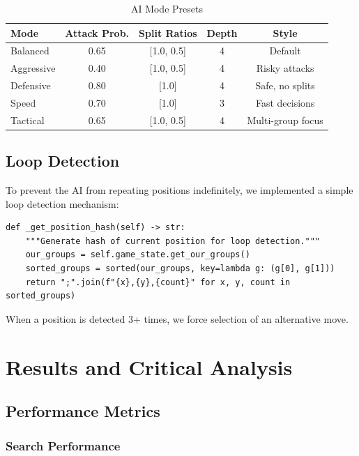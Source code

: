 \documentclass[11pt,a4paper]{article}
\begin{document}
\begin{table}[H]
\centering
\caption{AI Mode Presets}
\label{tab:modes}
\begin{tabular}{@{}lcccc@{}}
\toprule
\textbf{Mode} & \textbf{Attack Prob.} & \textbf{Split Ratios} & \textbf{Depth} & \textbf{Style} \\
\midrule
Balanced & 0.65 & [1.0, 0.5] & 4 & Default \\
Aggressive & 0.40 & [1.0, 0.5] & 4 & Risky attacks \\
Defensive & 0.80 & [1.0] & 4 & Safe, no splits \\
Speed & 0.70 & [1.0] & 3 & Fast decisions \\
Tactical & 0.65 & [1.0, 0.5] & 4 & Multi-group focus \\
\bottomrule
\end{tabular}
\end{table}

\subsection{Loop Detection}

To prevent the AI from repeating positions indefinitely, we implemented a simple loop detection mechanism:

\begin{lstlisting}[caption={Position Loop Detection}]
def _get_position_hash(self) -> str:
    """Generate hash of current position for loop detection."""
    our_groups = self.game_state.get_our_groups()
    sorted_groups = sorted(our_groups, key=lambda g: (g[0], g[1]))
    return ";".join(f"{x},{y},{count}" for x, y, count in sorted_groups)
\end{lstlisting}

When a position is detected 3+ times, we force selection of an alternative move.

\section{Results and Critical Analysis}

\subsection{Performance Metrics}

\subsubsection{Search Performance}
\end{document}
